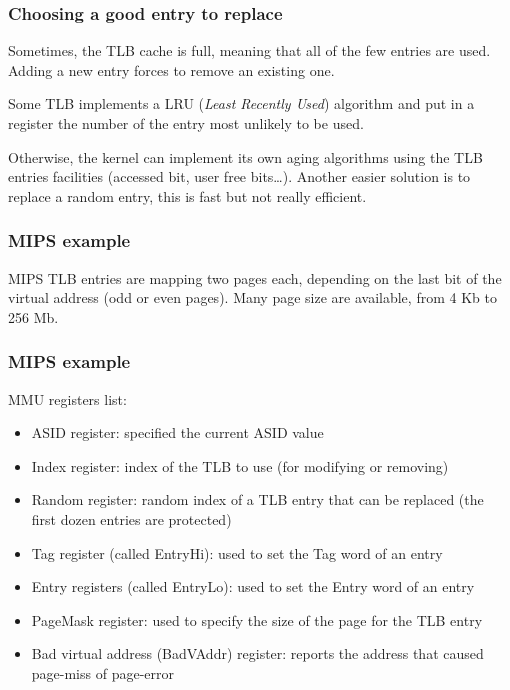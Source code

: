 
\begin{frame}
  \frametitle{Choosing a good entry to replace}

  Sometimes, the TLB cache is full, meaning that all of the few
  entries are used. Adding a new entry forces to remove an existing
  one.

  \-

  Some TLB implements a LRU (\emph{Least Recently Used}) algorithm and
  put in a register the number of the entry most unlikely to be used.

  \-

  Otherwise, the kernel can implement its own aging algorithms using
  the TLB entries facilities (accessed bit, user free
  bits\ldots). Another easier solution is to replace a random entry,
  this is fast but not really efficient.

\end{frame}


\begin{frame}
  \frametitle{MIPS example}

  \begin{center}
  \end{center}

  MIPS TLB entries are mapping two pages each, depending on the last
  bit of the virtual address (odd or even pages). Many page size are
  available, from 4 Kb to 256 Mb.

\end{frame}


\begin{frame}
  \frametitle{MIPS example}

  MMU registers list:

  \begin{itemize}
  \item
    ASID register: specified the current ASID value
  \item
    Index register: index of the TLB to use (for modifying or removing)
  \item
    Random register: random index of a TLB entry that can be replaced
    (the first dozen entries are protected)
  \item
    Tag register (called EntryHi): used to set the Tag word of an entry
  \item
    Entry registers (called EntryLo): used to set the Entry word of an entry
  \item
    PageMask register: used to specify the size of the page for the
    TLB entry
  \item
    Bad virtual address (BadVAddr) register: reports the address that
    caused page-miss of page-error
\end{itemize}

\end{frame}

